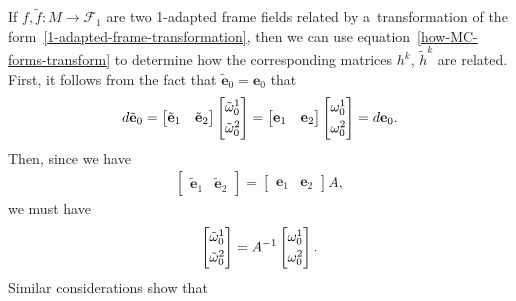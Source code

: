 \documentclass[10pt,a4paper]{amsart}
\numberwithin{equation}{section}
\theoremstyle{definition}
\begin{document}
If $f, \tilde{f}:M \to \mathcal{F}_1$ are two 1-adapted frame f\/ields related by a~transformation of the
form~\eqref{1-adapted-frame-transformation}, then we can use equation~\eqref{how-MC-forms-transform} to determine how
the corresponding matrices $h^k$, $\tilde{h}^k$ are related.
First, it follows from the fact that $\tilde{\mathbf{e}}_0 = \mathbf{e}_0$ that
\begin{gather*}
d\tilde{\mathbf{e}}_0 =
\begin{bmatrix}
\tilde{\mathbf{e}}_1 & \tilde{\mathbf{e}}_2
\end{bmatrix}
\begin{bmatrix}
\tilde{\omega}^1_0
\vspace{1mm}\\
\tilde{\omega}^2_0
\end{bmatrix}
=
\begin{bmatrix}
\mathbf{e}_1 & \mathbf{e}_2
\end{bmatrix}
\begin{bmatrix}
\omega^1_0
\vspace{1mm}\\
\omega^2_0
\end{bmatrix}
= d\mathbf{e}_0.
\end{gather*}
Then, since we have
\begin{gather*}
\begin{bmatrix}
\tilde{\mathbf{e}}_1 & \tilde{\mathbf{e}}_2
\end{bmatrix}
=
\begin{bmatrix}
\mathbf{e}_1 & \mathbf{e}_2
\end{bmatrix}
A,
\end{gather*}
we must have
\begin{gather}
\begin{bmatrix}
\tilde{\omega}^1_0
\vspace{1mm}\\
\tilde{\omega}^2_0
\end{bmatrix}
= A^{-1}
\begin{bmatrix}
\omega^1_0
\vspace{1mm}\\
\omega^2_0
\end{bmatrix}.
\label{semi-basic-trans}
\end{gather}
Similar considerations show that
\end{document}
